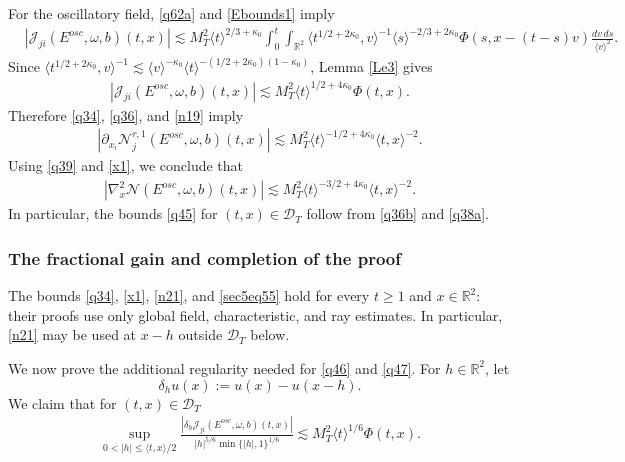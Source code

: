 \documentclass[reqno,11pt]{amsart}
\numberwithin{equation}{section}
\def\R{{\mathbb R}}
\def\R{{\bf R}}
\def\R{\mathbb{R}}
\begin{document}
For the oscillatory field, \eqref{q62a} and \eqref{Ebounds1} imply
\begin{align*}
&|\mathcal J_{ji}(E^{osc},\omega,b)(t,x)|\lesssim M_T^2\langle t\rangle^{2/3+\kappa_0}
\int_0^t\!\!\int_{\R^2}
\langle t^{1/2+2\kappa_0},v\rangle^{-1}
\langle s\rangle^{-2/3+2\kappa_0}\Phi(s,x-(t-s)v)
\frac{dv\,ds}{\langle v\rangle^2}.
\end{align*}
Since $\langle t^{1/2+2\kappa_0},v\rangle^{-1}
\lesssim\langle v\rangle^{-\kappa_0}
\langle t\rangle^{-(1/2+2\kappa_0)(1-\kappa_0)}$, 
Lemma \ref{Le3} gives
\begin{align}\label{n21}
|\mathcal J_{ji}(E^{osc},\omega,b)(t,x)|
\lesssim M_T^2\langle t\rangle^{1/2+4\kappa_0}\Phi(t,x).
\end{align}
Therefore \eqref{q34}, \eqref{q36}, and \eqref{n19} imply
\begin{align}\label{q36a}
\left|\partial_{x_i}\mathcal N_j^{r,1}(E^{osc},\omega,b)(t,x)\right|
\lesssim M_T^2\langle t\rangle^{-1/2+4\kappa_0}
\langle t,x\rangle^{-2}.
\end{align}
Using \eqref{q39} and \eqref{x1}, we conclude that
\begin{align}\label{q36b}
\left|\nabla_x^2\mathcal N(E^{osc},\omega,b)(t,x)\right|
\lesssim M_T^2\langle t\rangle^{-3/2+4\kappa_0}
\langle t,x\rangle^{-2}.
\end{align}
In particular, the bounds \eqref{q45} for $(t,x)\in\mathcal D_T$ follow from \eqref{q36b} and \eqref{q38a}.

\subsubsection{The fractional gain and completion of the proof}

The bounds \eqref{q34}, \eqref{x1}, \eqref{n21}, and \eqref{sec5eq55}
hold for every $t\geq1$ and $x\in\mathbb R^2$: their proofs use only
global field, characteristic, and ray estimates.
In particular, \eqref{n21} may be used at $x-h$ outside $\mathcal D_T$ below.

We now prove the additional regularity needed for \eqref{q46} and \eqref{q47}. For $h\in\mathbb R^2$, let
\[
\delta_hu(x):=u(x)-u(x-h).
\]
We claim that for $(t,x)\in\mathcal{D}_T$
\begin{align}\label{q17}
\sup_{0<|h|\leq\langle t,x\rangle/2}
\frac{|\delta_h\mathcal J_{ji}(E^{osc},\omega,b)(t,x)|
}{|h|^{5/6}\min\{|h|,1\}^{1/6}}
\lesssim M_T^2\langle t\rangle^{1/6}\Phi(t,x).
\end{align}
\end{document}
